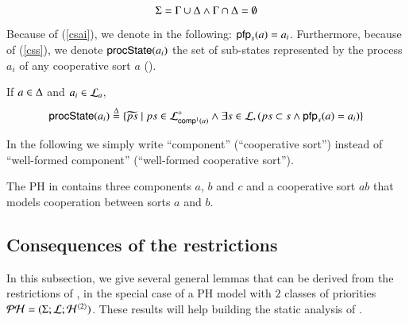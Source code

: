 \begin{condition}
\label{cr:compcs}
  $$\PHs = \components \cup \cs \wedge \components \cap \cs = \emptyset$$
\end{condition}

Because of (\ref{csai}), we denote in the following: $\pfp_s(a) = a_i$.
Furthermore, because of (\ref{css}), we denote $\csState(a_i)$ the set of sub-states represented by the process $a_i$ of any cooperative sort $a$ ().
\begin{definition}[$\csState : \PHproc \rightarrow \powerset(\PHproc)$]
\label{def:csState}
  If $a \in \cs$ and $a_i \in \PHl_a$, 
  $$\csState(a_i) \DEF \{ \toset{ps} \mid ps\in\PHsubl[\PHl]_{\compin(a)} \wedge
  							\exists s\in\PHl, (ps\subset s\wedge \pfp_s(a)=a_i)
							\}$$
\end{definition}

In the following we simply write “component” (\resp “cooperative sort”) instead of “well-formed component” (\resp “well-formed cooperative sort”).

\begin{example}
  The PH in  contains three components $a$, $b$ and $c$ and a cooperative sort $ab$ that models cooperation between sorts $a$ and $b$.
\end{example}


\subsection{Consequences of the restrictions}

In this subsection, we give several general lemmas that can be derived from the restrictions of , %
in the special case of a PH model with $2$ classes of priorities $\PH = (\PHs; \PHl; \PHa^{\langle 2 \rangle})$.
These results will help building the static analysis of .


